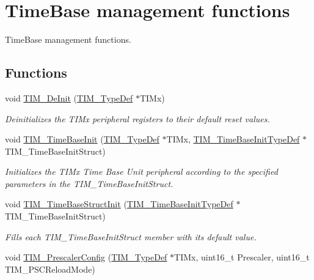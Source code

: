 \hypertarget{group___t_i_m___group1}{}\section{Time\+Base management functions}
\label{group___t_i_m___group1}


Time\+Base management functions.  


\subsection*{Functions}
\begin{DoxyCompactItemize}
\item 
void \hyperlink{group___t_i_m___group1_ga1659cc0ce503ac151568e0c7c02b1ba5}{T\+I\+M\+\_\+\+De\+Init} (\hyperlink{struct_t_i_m___type_def}{T\+I\+M\+\_\+\+Type\+Def} $\ast$T\+I\+Mx)
\begin{DoxyCompactList}\small\item\em Deinitializes the T\+I\+Mx peripheral registers to their default reset values. \end{DoxyCompactList}\item 
void \hyperlink{group___t_i_m___group1_ga83fd58c9416802d9638bbe1715c98932}{T\+I\+M\+\_\+\+Time\+Base\+Init} (\hyperlink{struct_t_i_m___type_def}{T\+I\+M\+\_\+\+Type\+Def} $\ast$T\+I\+Mx, \hyperlink{struct_t_i_m___time_base_init_type_def}{T\+I\+M\+\_\+\+Time\+Base\+Init\+Type\+Def} $\ast$T\+I\+M\+\_\+\+Time\+Base\+Init\+Struct)
\begin{DoxyCompactList}\small\item\em Initializes the T\+I\+Mx Time Base Unit peripheral according to the specified parameters in the T\+I\+M\+\_\+\+Time\+Base\+Init\+Struct. \end{DoxyCompactList}\item 
void \hyperlink{group___t_i_m___group1_ga1556a0b9a5d53506875fd7de0cbc6b1f}{T\+I\+M\+\_\+\+Time\+Base\+Struct\+Init} (\hyperlink{struct_t_i_m___time_base_init_type_def}{T\+I\+M\+\_\+\+Time\+Base\+Init\+Type\+Def} $\ast$T\+I\+M\+\_\+\+Time\+Base\+Init\+Struct)
\begin{DoxyCompactList}\small\item\em Fills each T\+I\+M\+\_\+\+Time\+Base\+Init\+Struct member with its default value. \end{DoxyCompactList}\item 
void \hyperlink{group___t_i_m___group1_ga45c6fd9041baf7f64c121e0172f305c7}{T\+I\+M\+\_\+\+Prescaler\+Config} (\hyperlink{struct_t_i_m___type_def}{T\+I\+M\+\_\+\+Type\+Def} $\ast$T\+I\+Mx, uint16\+\_\+t Prescaler, uint16\+\_\+t T\+I\+M\+\_\+\+P\+S\+C\+Reload\+Mode)

\end{DoxyCompactItemize}
